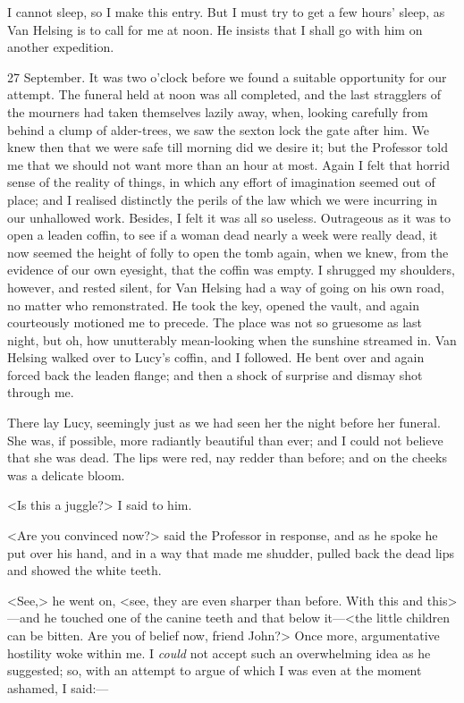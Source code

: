 I cannot sleep, so I make this entry. But I must try to get a few hours' sleep, as Van Helsing is to call for me at noon. He insists that I shall go with him on another expedition.

 

\begin{diary}{27 September.}
It was two o'clock before we found a suitable opportunity for our attempt. The funeral held at noon was all completed, and the last stragglers of the mourners had taken themselves lazily away, when, looking carefully from behind a clump of alder-trees, we saw the sexton lock the gate after him. We knew then that we were safe till morning did we desire it; but the Professor told me that we should not want more than an hour at most. Again I felt that horrid sense of the reality of things, in which any effort of imagination seemed out of place; and I realised distinctly the perils of the law which we were incurring in our unhallowed work. Besides, I felt it was all so useless. Outrageous as it was to open a leaden coffin, to see if a woman dead nearly a week were really dead, it now seemed the height of folly to open the tomb again, when we knew, from the evidence of our own eyesight, that the coffin was empty. I shrugged my shoulders, however, and rested silent, for Van Helsing had a way of going on his own road, no matter who remonstrated. He took the key, opened the vault, and again courteously motioned me to precede. The place was not so gruesome as last night, but oh, how unutterably mean-looking when the sunshine streamed in. Van Helsing walked over to Lucy's coffin, and I followed. He bent over and again forced back the leaden flange; and then a shock of surprise and dismay shot through me.

There lay Lucy, seemingly just as we had seen her the night before her funeral. She was, if possible, more radiantly beautiful than ever; and I could not believe that she was dead. The lips were red, nay redder than before; and on the cheeks was a delicate bloom.

<Is this a juggle?> I said to him.

<Are you convinced now?> said the Professor in response, and as he spoke he put over his hand, and in a way that made me shudder, pulled back the dead lips and showed the white teeth.

<See,> he went on, <see, they are even sharper than before. With this and this>—and he touched one of the canine teeth and that below it—<the little children can be bitten. Are you of belief now, friend John?> Once more, argumentative hostility woke within me. I \textit{could} not accept such an overwhelming idea as he suggested; so, with an attempt to argue of which I was even at the moment ashamed, I said:—


\end{diary}
